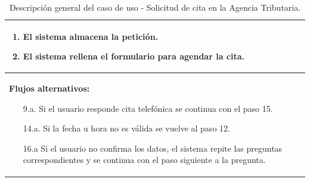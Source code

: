 \documentclass[12pt, a4paper, twoside]{report}
\begin{document}
\begin{table}[H]
\begin{tabular}{|p{16cm}|}
\begin{enumerate}
                    \item El sistema almacena la petición.
                    \item El sistema rellena el formulario para agendar la cita.
                \end{enumerate} \\ \hline
            \textbf{Flujos alternativos:}
                \begin{enumerate}
                    \item[9.a.] Si el usuario responde cita telefónica se continua con el paso 15.
                    \item[14.a.] Si la fecha u hora no es válida se vuelve al paso 12.
                    \item[16.a] Si el usuario no confirma los datos, el sistema repite las preguntas correspondientes y se continua con el paso siguiente a la pregunta.
                \end{enumerate} \\ \hline
            \end{tabular}
            \caption{Descripción general del caso de uso - Solicitud de cita en la Agencia Tributaria.}
            \end{table}
        
\end{document}
